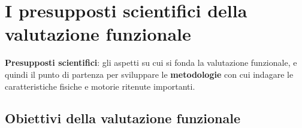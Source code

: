 \chapter{I presupposti scientifici della valutazione funzionale}

\textbf{Presupposti scientifici}: gli aspetti su cui si fonda la valutazione funzionale, e quindi
il punto di partenza per sviluppare le \textbf{metodologie} con cui indagare le caratteristiche
fisiche e motorie ritenute importanti.

\section{Obiettivi della valutazione funzionale}

